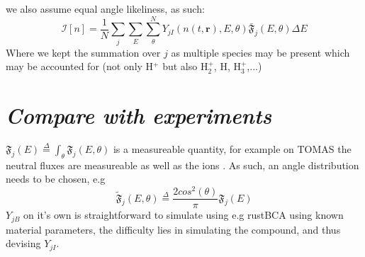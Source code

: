 \documentclass{article}
\begin{document}
we also assume equal angle likeliness, as such:
\begin{equation}
    \mathcal{I}[n] = \frac{1}{N}\sum_j\sum_E \sum_\theta^N Y_{jI}(n(t,\mathbf{r}),E,\theta)\bar{\mathfrak{F}}_j(E,\theta)\Delta E
\end{equation}
Where we kept the summation over $j$ as multiple species may be present which may be accounted for (not only H$^+$
but also H$_2^+$, H, H$_3^+$,...)
\section*{\textit{Compare with experiments}}
$\mathfrak{F}_j(E) \stackrel{\Delta}{=} \int_\theta \mathfrak{F}_j(E,\theta)$ is
a measureable quantity, for example on TOMAS the neutral fluxes are measureable
\cite{DanielNPA} as well as the ions \cite{AndreiRFEA}. As such, an angle distribution needs
to be chosen, e.g 
\begin{equation}
    \tilde{\mathfrak{F}}_j(E,\theta) \stackrel{\Delta}{=} \frac{2cos^2(\theta)}{\pi}\mathfrak{F}_j(E)
\end{equation}
$Y_{jB}$ on it's own is straightforward to simulate using e.g rustBCA using known material
parameters, the difficulty lies in simulating the compound, and thus devising $Y_{jI}$.



\end{document}
